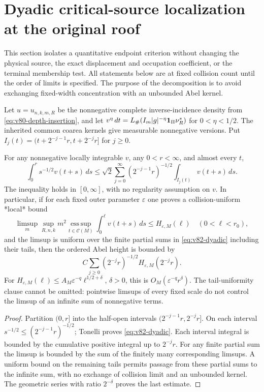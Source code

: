 \section{Dyadic critical-source localization at the original roof}
\label{sec:v82-critical-dyadic}
This section isolates a quantitative endpoint criterion without changing the
physical source, the exact displacement and occupation coefficient, or the
terminal membership test. All statements below are at fixed collision count
until the order of limits is specified. The purpose of the decomposition is
to avoid exchanging fixed-width concentration with an unbounded Abel kernel.

Let $u=u_{n,k,m,R}$ be the nonnegative complete inverse-incidence density
from \eqref{eq:v80-depth-insertion}, and let
$v^\eta\,dt=L_\#(I_m|g|^{-\eta}\mathbf1_\Pi\nu_R^*)$ for $0<\eta<1/2$.
The inherited common coarea kernels give measurable nonnegative versions.
Put $I_j(t)=(t+2^{-j-1}r,t+2^{-j}r]$ for $j\ge0$.

\begin{lemma}
\label{lem:v82-dyadic}
For any nonnegative locally integrable $v$, any $0<r<\infty$,
and almost every $t$,
\begin{equation}\label{eq:v82-dyadic}
 \int_0^r s^{-1/2}v(t+s)\,ds
 \le \sqrt2\sum_{j=0}^\infty
 (2^{-j-1}r)^{-1/2}
 \int_{I_j(t)}v(t+s)\,ds .
\end{equation}
The inequality holds in $[0,\infty]$, with no regularity assumption on
$v$. In particular, if for each fixed outer parameter $\varepsilon$
one proves a collision-uniform *local* bound
\begin{equation}\label{eq:v82-hypothesis}
 \limsup_m\sup_{R,n,k}
 m^2\operatorname*{ess\,sup}_{t\in\mathcal C(M)}
 \int_0^\ell v(t+s)\,ds\le H_{\varepsilon,M}(\ell)
 \quad (0<\ell<r_0),
\end{equation}
and the limsup is uniform over the finite partial sums in
\eqref{eq:v82-dyadic} including their tails, then the ordered Abel
height is bounded by
\begin{equation}\label{eq:v82-criterion}
 C\sum_{j\ge0}(2^{-j}r)^{-1/2}
 H_{\varepsilon,M}(2^{-j}r).
\end{equation}
For $H_{\varepsilon,M}(\ell)\le
A_M\varepsilon^{-q}\ell^{1/2+\delta}$, $\delta>0$, this is
$O_M(\varepsilon^{-q}r^\delta)$. The tail-uniformity clause cannot
be omitted: pointwise limsups of every fixed scale do not control
the limsup of an infinite sum of nonnegative terms.
\end{lemma}
\begin{proof}
Partition $(0,r]$ into the half-open intervals
$(2^{-j-1}r,2^{-j}r]$. On each interval
$s^{-1/2}\le(2^{-j-1}r)^{-1/2}$; Tonelli proves
\eqref{eq:v82-dyadic}. Each interval integral is bounded by the
cumulative positive integral up to $2^{-j}r$.
For any finite partial sum the limsup is bounded by the sum of
the finitely many corresponding limsups. A uniform bound on the
remaining tails permits passage from these partial sums to the
infinite sum, with no exchange of collision limit and an unbounded
kernel. The geometric series with ratio $2^{-\delta}$ proves the
last estimate.
\end{proof}

